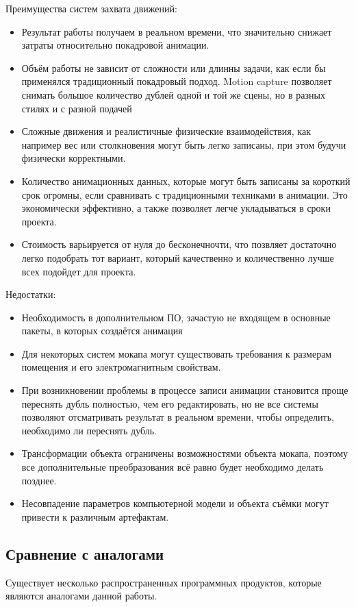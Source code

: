 Преимущества систем захвата движений:
\begin{itemize}
	\item Результат работы получаем в реальном времени, что значительно снижает затраты относительно покадровой анимации.
	\item Объём работы не зависит от сложности или длинны задачи, как если бы применялся традиционный покадровый подход. Motion capture позволяет снимать большое количество дублей одной и той же сцены, но в разных стилях и с разной подачей
	\item Сложные движения и реалистичные физические взаимодействия, как например вес или столкновения могут быть легко записаны, при этом будучи физически корректными.
	\item Количество анимационных данных, которые могут быть записаны за короткий срок огромны, если сравнивать с традиционными техниками в анимации. Это экономически эффективно, а также позволяет легче укладываться в сроки проекта.
	\item Стоимость варьируется от нуля до бесконечночти, что позвляет достаточно легко подобрать тот вариант, который качественно и количественно лучше всех подойдет для проекта.
\end{itemize}

Недостатки:
\begin{itemize}
	\item Необходимость в дополнительном ПО, зачастую не входящем в основные пакеты, в которых создаётся анимация
	\item Для некоторых систем мокапа могут существовать требования к размерам помещения и его электромагнитным свойствам.
	\item При возникновении проблемы в процессе записи анимации становится проще переснять дубль полностью, чем его редактировать, но не все системы позволяют отсматривать результат в реальном времени, чтобы определить, необходимо ли переснять дубль.
	\item Трансформации объекта ограничены возможностями объекта мокапа, поэтому все дополнительные преобразования всё равно будет необходимо делать позднее.
	\item Несовпадение параметров компьютерной модели и объекта съёмки могут привести к различным артефактам.
\end{itemize}



\subsection{Сравнение с аналогами}
Существует несколько распространенных программных продуктов, которые являются аналогами данной работы.

